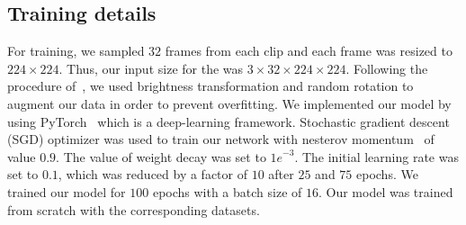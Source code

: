     \subsection{Training details}
     For training, we sampled $32$ frames from each clip and each frame was resized to ${224}\times{224}$. 
     Thus, our input size for the was ${3}\times{32}\times{224}\times{224}$. 
     Following the procedure of~\cite{cheng2019rwf}, we used brightness transformation and random rotation to augment our data in order to prevent overfitting.
     We implemented our model by using PyTorch~\cite{pytorchpaszke2019} which is a deep-learning framework. Stochastic gradient descent (SGD) optimizer was used to train our network with nesterov momentum~\cite{nesterovbotev2017} of value $0.9$. The value of weight decay was set to ${1e}^{-3}$. The initial learning rate was set to $0.1$, which was reduced by a factor of $10$ after $25$ and $75$ epochs. We trained our model for $100$ epochs with a batch size of $16$. 
     Our model was trained from scratch with the corresponding datasets.
     



